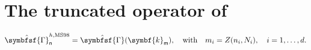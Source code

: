 \documentclass[draft, appendixprefix=true, chapterprefix=true, fontsize=12pt, numbers=noendperiod]{scrbook}
\newcommand{\tens}[1]{\symbfsf{#1}}
\renewcommand{\vec}[1]{\symbf{#1}}
\newcommand{\tuple}[1]{\mathsf{#1}}
\begin{document}
\section{The truncated operator of \textcite{moul1998}}

\begin{equation}
  \hat{\tens\Gamma}_{\tuple{n}}^{h, \mathrm{MS98}}=\hat{\tens\Gamma}(\vec k_{\tuple{m}}),\quad\text{with}\quad
  m_i=Z(n_i, N_i),\quad i=1,\ldots, d.
\end{equation}


\printbibliography
\end{document}
